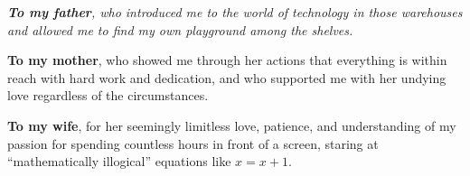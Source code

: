 \thispagestyle{empty}

\null\vfill
\begin{center}
\begin{minipage}{0.72\textwidth}
{\itshape
\textbf{To my father}, who introduced me to the world of technology in those
warehouses and allowed me to find my own playground among the shelves.

\bigskip

\textbf{To my mother}, who showed me through her actions that everything is
within reach with hard work and dedication, and who supported me with
her undying love regardless of the circumstances.

\bigskip

\textbf{To my wife}, for her seemingly limitless love, patience, and
understanding of my passion for spending countless hours in front of
a screen, staring at ``mathematically illogical'' equations like
$x = x + 1$.
}
\end{minipage}
\end{center}
\vfill\null

\clearpage